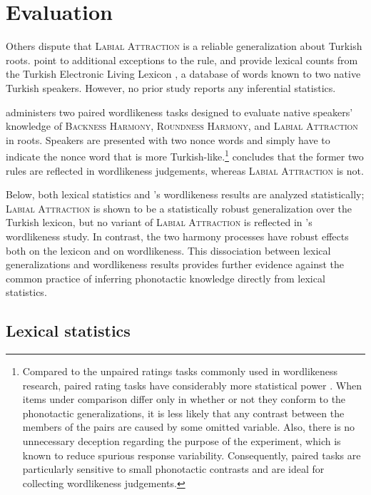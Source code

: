 \section{Evaluation}
\label{3evaluation}

Others dispute that \textsc{Labial Attraction} is a reliable generalization about Turkish roots. \citet{Clements1982} point to additional exceptions to the rule, and \citet{Inkelas2001} provide lexical counts from the Turkish Electronic Living Lexicon \citep[TELL;][]{TELL}, a database of words known to two native Turkish speakers. However, no prior study reports any inferential statistics.

\citet[311]{Zimmer1969} administers two paired wordlikeness tasks designed to evaluate native speakers' knowledge of \textsc{Backness Harmony}, \textsc{Roundness Harmony}, and \textsc{Labial Attraction} in roots. Speakers are presented with two nonce words and simply have to indicate the nonce word that is more Turkish-like.\footnote{Compared to the unpaired ratings tasks  commonly used in wordlikeness research, paired rating tasks have considerably more statistical power \citep{Gigerenzer2004}. When items under comparison differ only in whether or not they conform to the phonotactic generalizations, it is less likely that any contrast between the members of the pairs are caused by some omitted variable. Also, there is no unnecessary deception regarding the purpose of the experiment, which is known to reduce spurious response variability. Consequently, paired tasks are particularly sensitive to small phonotactic contrasts and are ideal for collecting wordlikeness judgements.} \citeauthor{Zimmer1969} concludes that the former two rules are reflected in wordlikeness judgements, whereas \textsc{Labial Attraction} is not. 

Below, both lexical statistics and \citeauthor{Zimmer1969}'s wordlikeness results are analyzed statistically; \textsc{Labial Attraction} is shown to be a statistically robust generalization over the Turkish lexicon, but no variant of \textsc{Labial Attraction} is reflected in \citeauthor{Zimmer1969}'s wordlikeness study. In contrast, the two harmony processes have robust effects both on the lexicon and on wordlikeness.  This dissociation between lexical generalizations and wordlikeness results provides further evidence against the common practice of inferring phonotactic knowledge directly from lexical statistics.

\subsection{Lexical statistics}

